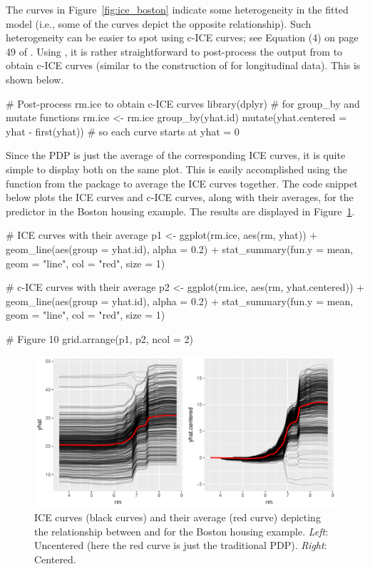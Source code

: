 The curves in Figure~\ref{fig:ice_boston} indicate some heterogeneity in the fitted model (i.e., some of the curves depict the opposite relationship). Such heterogeneity can be easier to spot using c-ICE curves; see Equation (4) on page 49 of \citet{goldstein-peeking-2015}. Using  \citep{dplyr-pkg}, it is rather straightforward to post-process the output from  to obtain c-ICE curves (similar to the construction of  \citep[pg. 130]{fitzmaurice-2011-applied} for longitudinal data). This is shown below.
\begin{example}
# Post-process rm.ice to obtain c-ICE curves
library(dplyr)  # for group_by and mutate functions
rm.ice <- rm.ice %
  group_by(yhat.id) %
  mutate(yhat.centered = yhat - first(yhat))  # so each curve starts at yhat = 0
\end{example}

Since the PDP is just the average of the corresponding ICE curves, it is quite simple to display both on the same plot. This is easily accomplished using the  function from the  package to average the ICE curves together. The code snippet below plots the ICE curves and c-ICE curves, along with their averages, for the predictor  in the Boston housing example. The results are displayed in Figure~\ref{fig:ice_cice_boston}.
\begin{example}
# ICE curves with their average
p1 <- ggplot(rm.ice, aes(rm, yhat)) +
  geom_line(aes(group = yhat.id), alpha = 0.2) +
  stat_summary(fun.y = mean, geom = "line", col = "red", size = 1)

# c-ICE curves with their average
p2 <- ggplot(rm.ice, aes(rm, yhat.centered)) +
  geom_line(aes(group = yhat.id), alpha = 0.2) +
  stat_summary(fun.y = mean, geom = "line", col = "red", size = 1)

# Figure 10
grid.arrange(p1, p2, ncol = 2)
\end{example}
\begin{figure}[!htbp]
  \centering
  \includegraphics[width=1.0\linewidth]{ice_cice_boston}
  \caption{ICE curves (black curves) and their average (red curve) depicting the relationship between  and  for the Boston housing example. \textit{Left}: Uncentered (here the red curve is just the traditional PDP). \textit{Right}: Centered.}
  \label{fig:ice_cice_boston}
\end{figure}


